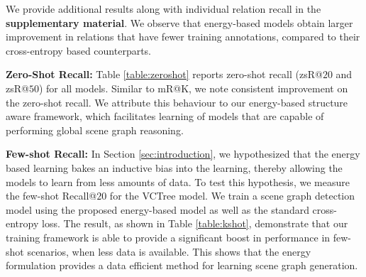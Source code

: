 \documentclass[final]{cvpr}
\begin{document}
We provide additional results along with individual relation recall in the \textbf{supplementary material}. We observe that energy-based models obtain larger improvement in relations that have fewer training annotations, compared to their cross-entropy based counterparts.

\vspace{0.06in}
\noindent
{\bf Zero-Shot Recall:}
Table \ref{table:zeroshot} reports zero-shot recall (zsR@$20$ and zsR@$50$) for all models. Similar to mR@K, we note consistent improvement on the zero-shot recall. We attribute this behaviour to our energy-based structure aware framework, which facilitates learning of models that are capable of performing global scene graph reasoning.

\vspace{0.06in}
\noindent
{\bf Few-shot Recall:}
In Section \ref{sec:introduction}, we hypothesized that the energy based learning bakes an inductive bias into the learning, thereby allowing the models to learn from less amounts of data. To test this hypothesis, we measure the few-shot Recall@$20$ for the VCTree model. We train a scene graph detection model using the proposed energy-based model as well as the standard cross-entropy loss. The result, as shown in Table \ref{table:kshot}, demonstrate that our training framework is able to provide a significant boost in performance in few-shot scenarios, when less data is available. This shows that the energy formulation provides a data efficient method for learning scene graph generation.
\end{document}
